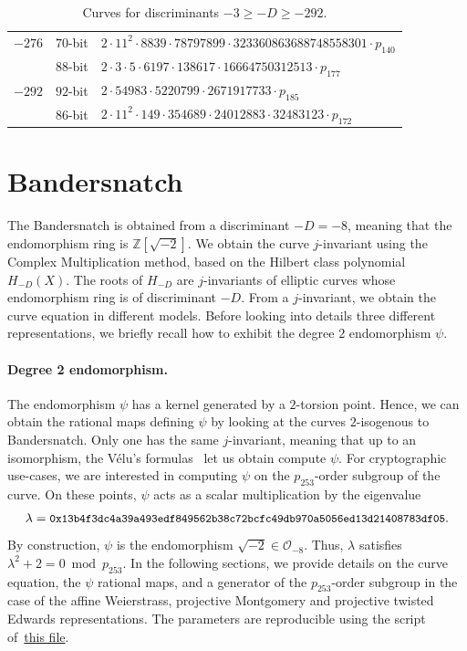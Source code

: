 \documentclass{article}
\newcommand{\Z}{\ensuremath{\mathbb Z}}
\theoremstyle{definition}
\begin{document}
\begin{table}[!ht]
\begin{tabularx}{\textwidth}{ccl}
$-276$ & $70$-bit & $2  \cdot 11^{2}  \cdot 8839  \cdot 78797899  \cdot 323360863688748558301  \cdot p_{140}$\\
 & $88$-bit & $2  \cdot 3  \cdot 5  \cdot 6197  \cdot 138617  \cdot 16664750312513  \cdot p_{177}$\\
$-292$ & $92$-bit & $2  \cdot 54983  \cdot 5220799  \cdot 2671917733  \cdot p_{185}$\\
 & $86$-bit & $2  \cdot 11^{2}  \cdot 149  \cdot 354689  \cdot
24012883  \cdot 32483123  \cdot p_{172}$\\
\bottomrule
    \end{tabularx}
    \caption{Curves for discriminants $-3 \geq -D \geq -292$.}
    \label{tab:group-order-factorization}
\end{table}

\section{Bandersnatch}\label{sec:bandersnatch}

The Bandersnatch is obtained from a discriminant $-D = -8$, meaning
that the endomorphism ring is $\Z[\sqrt{-2}]$.
We obtain the curve $j$-invariant using the Complex Multiplication
method, based on the Hilbert class polynomial $H_{-D}(X)$.
The roots of $H_{-D}$ are $j$-invariants of elliptic curves whose
endomorphism ring is of discriminant $-D$.
From a $j$-invariant, we obtain the curve equation in different
models. Before looking into details three different representations,
we briefly recall how to exhibit the degree $2$ endomorphism $\psi$.

\paragraph{Degree 2 endomorphism.}
The endomorphism $\psi$ has a kernel generated by a $2$-torsion
point. Hence, we can obtain the rational maps defining $\psi$ by
looking at the curves $2$-isogenous to Bandersnatch. Only one has the
same $j$-invariant, meaning that up to an isomorphism, the Vélu's
formulas~\cite{velu71} let us obtain compute $\psi$.
For cryptographic use-cases, we are interested in computing $\psi$ on
the $p_{253}$-order subgroup of the curve. On these points, $\psi$
acts as a scalar multiplication by the eigenvalue
$$\lambda = \text{\small{\tt
    0x13b4f3dc4a39a493edf849562b38c72bcfc49db970a5056ed13d21408783df05}}.$$
By construction, $\psi$ is the endomorphism $\sqrt{-2}\in \mathcal
O_{-8}$. Thus, $\lambda$ satisfies
$\lambda^2+2 = 0 \bmod p_{253}$.
In the following sections, we provide details on the curve equation,
the $\psi$ rational maps, and a generator of the $p_{253}$-order
subgroup in the case of the affine Weierstrass, projective Montgomery
and projective twisted Edwards representations.
The parameters are reproducible using the script
of~\href{https://github.com/asanso/Bandersnatch/blob/main/code/get\_params.py}{this
  file}.
\end{document}
